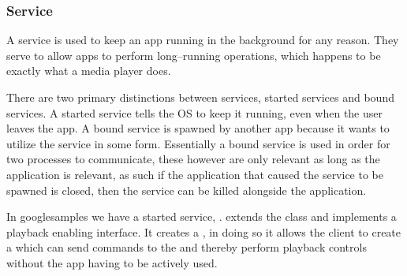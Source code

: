 \subsubsection{Service}
A service is used to keep an app running in the background for any reason.
They serve to allow apps to perform long--running operations, which happens to be exactly what a media player does.

There are two primary distinctions between services, started services and bound services.
A started service tells the OS to keep it running, even when the user leaves the app.
A bound service is spawned by another app because it wants to utilize the service in some form.
Essentially a bound service is used in order for two processes to communicate, these however are only relevant as long as the application is relevant, as such if the application that caused the service to be spawned is closed, then the service can be killed alongside the application.\cite{androidFundamentals}

In googlesamples we have a started service, .
 extends the  class and implements a playback enabling interface.
It creates a , in doing so it allows the client to create a  which can send commands to the  and thereby perform playback controls without the app having to be actively used.
